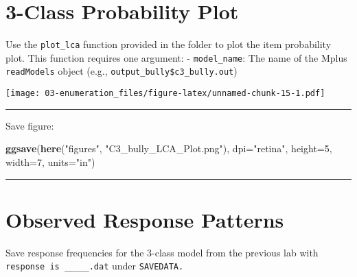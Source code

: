 \documentclass[
]{book}
\newenvironment{Shaded}{\begin{snugshade}}{\end{snugshade}}
\newcommand{\AttributeTok}[1]{\textcolor[rgb]{0.13,0.29,0.53}{#1}}
\newcommand{\DecValTok}[1]{\textcolor[rgb]{0.00,0.00,0.81}{#1}}
\newcommand{\FunctionTok}[1]{\textcolor[rgb]{0.13,0.29,0.53}{\textbf{#1}}}
\newcommand{\NormalTok}[1]{#1}
\newcommand{\SpecialCharTok}[1]{\textcolor[rgb]{0.81,0.36,0.00}{\textbf{#1}}}
\newcommand{\StringTok}[1]{\textcolor[rgb]{0.31,0.60,0.02}{#1}}
\begin{document}
\section{3-Class Probability Plot}\label{class-probability-plot}

Use the \texttt{plot\_lca} function provided in the folder to plot the item probability plot. This function requires one argument:
- \texttt{model\_name}: The name of the Mplus \texttt{readModels} object (e.g., \texttt{output\_bully\$c3\_bully.out})

\begin{Shaded}
\end{Shaded}

\texttt{[image: 03-enumeration\_files/figure-latex/unnamed-chunk-15-1.pdf]}

\begin{center}\rule{0.5\linewidth}{0.5pt}\end{center}

Save figure:

\begin{Shaded}
\begin{Highlighting}[]
\FunctionTok{ggsave}\NormalTok{(}\FunctionTok{here}\NormalTok{(}\StringTok{"figures"}\NormalTok{, }\StringTok{"C3\_bully\_LCA\_Plot.png"}\NormalTok{), }\AttributeTok{dpi=}\StringTok{"retina"}\NormalTok{, }\AttributeTok{height=}\DecValTok{5}\NormalTok{, }\AttributeTok{width=}\DecValTok{7}\NormalTok{, }\AttributeTok{units=}\StringTok{"in"}\NormalTok{)}
\end{Highlighting}
\end{Shaded}

\begin{center}\rule{0.5\linewidth}{0.5pt}\end{center}

\section{Observed Response Patterns}\label{observed-response-patterns}

Save response frequencies for the 3-class model from the previous lab with \texttt{response\ is\ \_\_\_\_\_.dat} under \texttt{SAVEDATA.}
\end{document}
